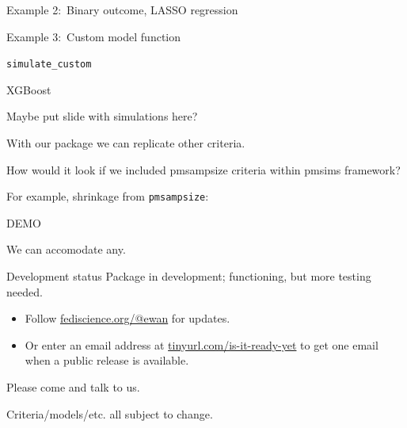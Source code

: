 \documentclass[11pt]{beamer}
\begin{document}
\begin{frame}[t]{Example 2:\ Binary outcome, LASSO regression }

\end{frame}

\begin{frame}[t]{Example 3:\ Custom model function}

	\texttt{simulate\_custom}

	XGBoost

\end{frame}

\begin{frame}[t]{Maybe put slide with simulations here?}

	With our package we can replicate other criteria.

	How would it look if we included pmsampsize criteria within pmsims
	framework?

	For example, shrinkage from \texttt{pmsampsize}:

	DEMO

	We can accomodate any.
\end{frame}

\begin{frame}[t]{Development status}
	Package in development; functioning, but more testing needed.

	\begin{itemize}
		\item Follow
		      \href{https://fediscience.org/@ewan}{\textcolor{KCLseablue}{fediscience.org/@ewan}}
		      for updates.
		\item Or enter an email address at
		      \href{https://tinyurl.com/pmsims-announce}{\textcolor{KCLseablue}{tinyurl.com/is-it-ready-yet}}
		      to get one email when a public release is available.
	\end{itemize}

	Please come and talk to us.

	Criteria/models/etc. all subject to change.

\end{frame}

\end{document}
